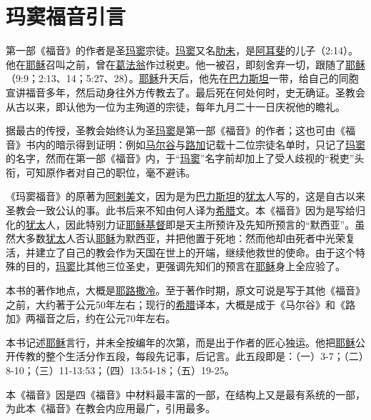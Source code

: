\chapter*{玛窦福音引言}


第一部《福音》的作者是圣\uline{玛窦}宗徒。\uline{玛窦}又名\uline{肋未}，是\uline{阿耳斐}的儿子（2:14）。他在\uline{耶稣}召叫之前，曾在\uline{葛法翁}作过税吏。他一被召，即刻舍弃一切，跟随了\uline{耶稣}（9:9；2:13、14；5:27、28）。\uline{耶稣}升天后，他先在\uline{巴力斯坦}一带，给自己的同胞宣讲福音多年，然后动身往外方传教去了。最后死在何处何时，史无确证。圣教会从古以来，即认他为一位为主殉道的宗徒，每年九月二十一日庆祝他的瞻礼。

据最古的传授，圣教会始终认为圣\uline{玛窦}是第一部《福音》的作者；这也可由《福音》书内的暗示得到证明：例如\uline{马尔谷}与\uline{路加}记载十二位宗徒名单时，只记了\uline{玛窦}的名字，然而在第一部《福音》内，于“\uline{玛窦}”名字前却加上了受人歧视的“税吏”头衔，可知原作者对自己的职位，毫不避讳。

《玛窦福音》的原著为\uline{阿剌美}文，因为是为\uline{巴力斯坦}的\uline{犹太}人写的，这是自古以来圣教会一致公认的事。此书后来不知由何人译为\uline{希腊}文。本《福音》因为是写给归化的\uline{犹太}人，因此特别力证\uline{耶稣}\uline{基督}即是天主所预许及先知所预言的“默西亚”。虽然大多数\uline{犹太}人否认\uline{耶稣}为默西亚，并把他置于死地：然而他却由死者中光荣复活，并建立了自己的教会作为天国在世上的开端，继续他救世的使命。由于这个特殊的目的，\uline{玛窦}比其他三位圣史，更强调先知们的预言在\uline{耶稣}身上全应验了。

本书的著作地点，大概是\uline{耶路撒冷}。至于著作时期，原文可说是写于其他《福音》之前，大约著于公元50年左右；现行的\uline{希腊}译本，大概是成于《马尔谷》和《路加》两福音之后，约在公元70年左右。

本书记述\uline{耶稣}言行，并未全按编年的次第，而是出于作者的匠心独运。他把\uline{耶稣}公开传教的整个生活分作五段，每段先记事，后记言。此五段即是：（一）3-7；（二）8-10；（三）11-13:53；（四）13:54-18；（五）19-25。

本《福音》因是四《福音》中材料最丰富的一部，在结构上又是最有系统的一部，为此本《福音》在教会内应用最广，引用最多。